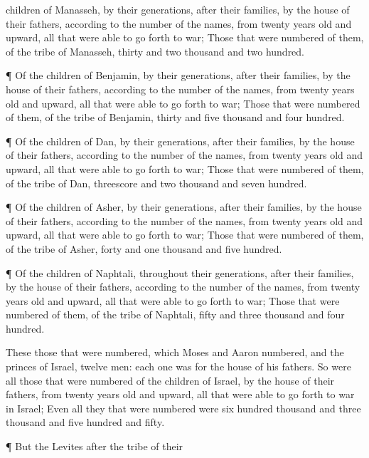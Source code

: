 {children of
Manasseh, by their
generations, after their
families, by the
house of their
fathers, according to the
number of the
names, from
twenty
years
old and
upward, all that were able to go
forth to
war;
Those that were
numbered of them,
{} of the
tribe of
Manasseh,
{}
thirty and
two
thousand and two
hundred.
\par }{\PP {}¶ Of the
children of
Benjamin, by their
generations, after their
families, by the
house of their
fathers, according to the
number of the
names, from
twenty
years
old and
upward, all that were able to go
forth to
war;
Those that were
numbered of them,
{} of the
tribe of
Benjamin,
{}
thirty and
five
thousand and
four
hundred.
\par }{\PP {}¶ Of the
children of
Dan, by their
generations, after their
families, by the
house of their
fathers, according to the
number of the
names, from
twenty
years
old and
upward, all that were able to go
forth to
war;
Those that were
numbered of them,
{} of the
tribe of
Dan,
{}
threescore and
two
thousand and
seven
hundred.
\par }{\PP {}¶ Of the
children of
Asher, by their
generations, after their
families, by the
house of their
fathers, according to the
number of the
names, from
twenty
years
old and
upward, all that were able to go
forth to
war;
Those that were
numbered of them,
{} of the
tribe of
Asher,
{}
forty and
one
thousand and
five
hundred.
\par }{\PP {}¶ Of the
children of
Naphtali, throughout their
generations, after their
families, by the
house of their
fathers, according to the
number of the
names, from
twenty
years
old and
upward, all that were able to go
forth to
war;
Those that were
numbered of them,
{} of the
tribe of
Naphtali,
{}
fifty and
three
thousand and
four
hundred.
\par }{\PP {}These
{} those that were
numbered, which
Moses and
Aaron
numbered, and the
princes of
Israel,
{}
twelve
men:
each
one was for the
house of his
fathers.
So were all those that were
numbered of the
children of
Israel, by the
house of their
fathers, from
twenty
years
old and
upward, all that were able to go
forth to
war in
Israel;
Even all they that were
numbered were
six
hundred
thousand and
three
thousand and
five
hundred and
fifty.
\par }{\PP {}¶ But the
Levites after the
tribe of their
}
